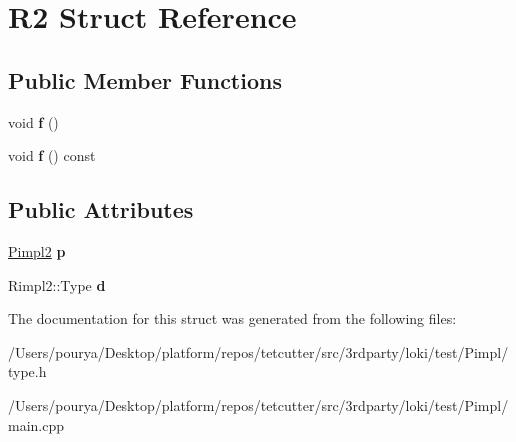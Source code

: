 \hypertarget{structR2}{}\section{R2 Struct Reference}
\label{structR2}
\subsection*{Public Member Functions}
\begin{DoxyCompactItemize}
\item 
\hypertarget{structR2_af8d56262e809b1e0a1889ad88d409684}{}void {\bfseries f} ()\label{structR2_af8d56262e809b1e0a1889ad88d409684}

\item 
\hypertarget{structR2_a208b2f64bc509af1cf8c0d40ab01c223}{}void {\bfseries f} () const \label{structR2_a208b2f64bc509af1cf8c0d40ab01c223}

\end{DoxyCompactItemize}
\subsection*{Public Attributes}
\begin{DoxyCompactItemize}
\item 
\hypertarget{structR2_aa4db858ebc5d502db54247b7236ec8d5}{}\hyperlink{classLoki_1_1Pimpl}{Pimpl2} {\bfseries p}\label{structR2_aa4db858ebc5d502db54247b7236ec8d5}

\item 
\hypertarget{structR2_abc5e1b7fff51284e5283b32dff4b3c2d}{}Rimpl2\+::\+Type {\bfseries d}\label{structR2_abc5e1b7fff51284e5283b32dff4b3c2d}

\end{DoxyCompactItemize}


The documentation for this struct was generated from the following files\+:\begin{DoxyCompactItemize}
\item 
/\+Users/pourya/\+Desktop/platform/repos/tetcutter/src/3rdparty/loki/test/\+Pimpl/type.\+h\item 
/\+Users/pourya/\+Desktop/platform/repos/tetcutter/src/3rdparty/loki/test/\+Pimpl/main.\+cpp\end{DoxyCompactItemize}
